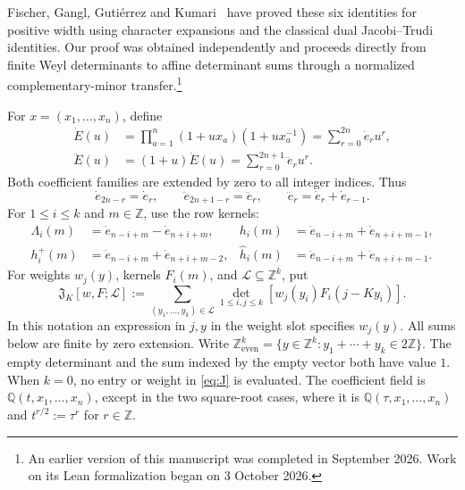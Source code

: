 \documentclass[12pt]{article}
\numberwithin{equation}{section}
\newcommand{\Q}{\mathbb Q}
\newcommand{\Z}{\mathbb Z}
\newcommand{\dote}{\dot e}
\newcommand{\ddote}{\ddot e}
\newcommand{\dotE}{\dot E}
\newcommand{\ddotE}{\ddot E}
\newcommand{\Jaff}{\mathfrak J}
\newcommand{\latticeeven}{\Z_{\mathrm{even}}^k}
\begin{document}
Fischer, Gangl, Guti\'errez and Kumari~\cite{FGGK2026}
have proved these six identities for positive width using character
expansions and the classical dual Jacobi--Trudi identities.
Our proof was obtained independently and proceeds directly from
finite Weyl determinants to affine determinant sums through a
normalized complementary-minor transfer.\footnote{An earlier
version of this manuscript was completed in September 2026.
Work on its Lean formalization began on 3 October 2026.}

For $x=(x_1,\ldots,x_n)$, define
\begin{equation}\label{eq:elementary}
\begin{aligned}
 \dotE(u)&=\prod_{a=1}^n(1+ux_a)(1+ux_a^{-1})
          =\sum_{r=0}^{2n}\dote_r u^r,\\
 \ddotE(u)&=(1+u)\dotE(u)=\sum_{r=0}^{2n+1}\ddote_r u^r.
\end{aligned}
\end{equation}
Both coefficient families are extended by zero to all integer indices.
Thus
\[
 \dote_{2n-r}=\dote_r,\qquad
 \ddote_{2n+1-r}=\ddote_r,\qquad
 \ddote_r=\dote_r+\dote_{r-1}.
\]
For $1\le i\le k$ and $m\in\Z$, use the row kernels:
\begin{align*}
 \Lambda_i(m)&=\dote_{n-i+m}-\dote_{n+i+m},&
 h_i(m)&=\dote_{n-i+m}+\dote_{n+i+m-1},\\
 h_i^+(m)&=\dote_{n-i+m}+\dote_{n+i+m-2},&
 \widehat h_i(m)&=\ddote_{n-i+m}+\ddote_{n+i+m-1}.
\end{align*}
For weights $w_j(y)$, kernels $F_i(m)$, and
$\mathcal L\subseteq\Z^k$, put
\begin{equation}\label{eq:J}
 \Jaff_K[w,F;\mathcal L]
 :=\sum_{(y_1,\ldots,y_k)\in\mathcal L}
       \det_{1\le i,j\le k}[w_j(y_i)F_i(j-Ky_i)].
\end{equation}
In this notation an expression in $j,y$ in the weight slot specifies
$w_j(y)$.  All sums below are finite by zero extension.  Write
$\latticeeven=\{y\in\Z^k:y_1+\cdots+y_k\in2\Z\}$.
The empty determinant and the sum indexed by the empty vector both have
value $1$.  When $k=0$, no entry or weight in \eqref{eq:J} is evaluated.
The coefficient field is $\Q(t,x_1,\ldots,x_n)$, except in the
two square-root cases, where it is $\Q(\tau,x_1,\ldots,x_n)$ and
$t^{r/2}:=\tau^r$ for $r\in\Z$.
\end{document}
